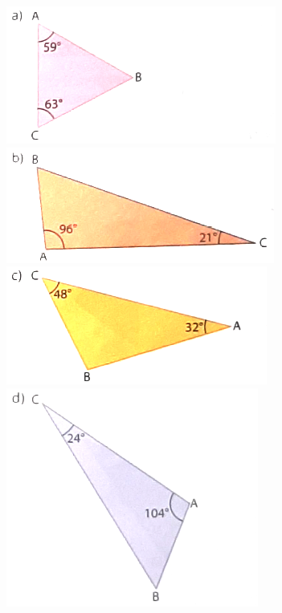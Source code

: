\documentclass[a4paper,14pt]{article}
\begin{document}
\begin{multicols}{2}
\begin{enumerate}
			\includegraphics[width=1\linewidth]{6FMA107_imagens/imagem11}
			\includegraphics[width=1\linewidth]{6FMA107_imagens/imagem12}
			\includegraphics[width=1\linewidth]{6FMA107_imagens/imagem13}
			\includegraphics[width=1\linewidth]{6FMA107_imagens/imagem14}

\end{enumerate}
\end{multicols}
\end{document}
